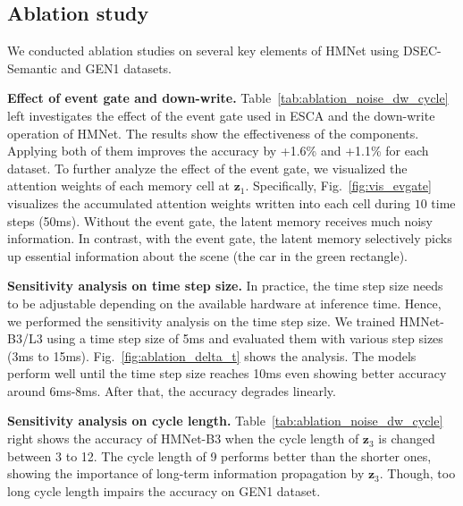 \tbAblationNoiseDWCycle
\figVisEvGate
\figAblationDeltaT

\subsection{Ablation study}
\label{sec:ablation_study}
We conducted ablation studies on several key elements of HMNet using DSEC-Semantic and GEN1 datasets.

\vspace{0.1cm}
\noindent
\textbf{Effect of event gate and down-write.}
Table~\ref{tab:ablation_noise_dw_cycle} left investigates the effect of the event gate used in ESCA and the down-write operation of HMNet.
The results show the effectiveness of the components.
Applying both of them improves the accuracy by +1.6\% and +1.1\% for each dataset.
To further analyze the effect of the event gate, we visualized the attention weights of each memory cell at $\bm{z}_1$.
Specifically, Fig.~\ref{fig:vis_evgate} visualizes the accumulated attention weights written into each cell during $10$ time steps (\ie 50ms).
Without the event gate, the latent memory receives much noisy information. In contrast, with the event gate, the latent memory selectively picks up essential information about the scene (\eg the car in the green rectangle).

\vspace{0.1cm}
\noindent
\textbf{Sensitivity analysis on time step size.}
In practice, the time step size needs to be adjustable depending on the available hardware at inference time.
Hence, we performed the sensitivity analysis on the time step size.
We trained HMNet-B3/L3 using a time step size of 5ms and evaluated them with various step sizes
(3ms to 15ms).
Fig.~\ref{fig:ablation_delta_t} shows the analysis.
The models perform well until the time step size reaches 10ms
even showing better accuracy around 6ms-8ms. After that, the accuracy degrades linearly.

\vspace{0.1cm}
\noindent
\textbf{Sensitivity analysis on cycle length.}
Table~\ref{tab:ablation_noise_dw_cycle} right shows the accuracy of HMNet-B3 when the cycle length of $\bm{z}_3$ is changed between 3 to 12.
The cycle length of 9 performs better than the shorter ones, showing the importance of long-term information propagation by $\bm{z}_3$.
Though, too long cycle length impairs the accuracy on GEN1 dataset.

